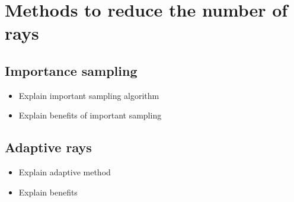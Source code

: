 \section{Methods to reduce the number of rays}

\subsection{Importance sampling}
	\begin{itemize}
	\item Explain important sampling algorithm
	\item Explain benefits of important sampling
	\end{itemize}

\subsection{Adaptive rays}
	\begin{itemize}
	\item Explain adaptive method
	\item Explain benefits 
	\end{itemize}
